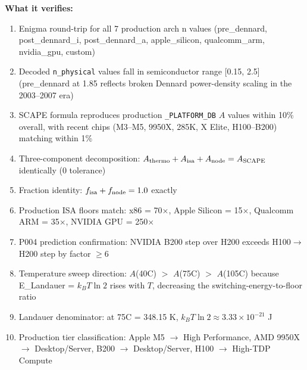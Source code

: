 \documentclass[12pt,a4paper]{article}
\begin{document}
\textbf{What it verifies:}
\begin{enumerate}
\item Enigma round-trip for all 7 production arch n values (pre\_dennard,
  post\_dennard\_i, post\_dennard\_a, apple\_silicon, qualcomm\_arm,
  nvidia\_gpu, custom)
\item Decoded \texttt{n\_physical} values fall in semiconductor range
  [0.15, 2.5] (pre\_dennard at 1.85 reflects broken Dennard power-density
  scaling in the 2003--2007 era)
\item SCAPE formula reproduces production \texttt{\_PLATFORM\_DB} $A$ values
  within 10\% overall, with recent chips (M3--M5, 9950X, 285K, X Elite,
  H100--B200) matching within 1\%
\item Three-component decomposition: $A_{\rm thermo} + A_{\rm isa} +
  A_{\rm node} = A_{\rm SCAPE}$ identically (0 tolerance)
\item Fraction identity: $f_{\rm isa} + f_{\rm node} = 1.0$ exactly
\item Production ISA floors match: x86 = 70$\times$, Apple Silicon = 15$\times$,
  Qualcomm ARM = 35$\times$, NVIDIA GPU = 250$\times$
\item P004 prediction confirmation: NVIDIA B200 step over H200 exceeds
  H100$\to$H200 step by factor $\ge 6$
\item Temperature sweep direction: $A$(40\textdegree C) $>$ $A$(75\textdegree C)
  $>$ $A$(105\textdegree C) because E\_Landauer = $k_B T \ln 2$ rises with $T$,
  decreasing the switching-energy-to-floor ratio
\item Landauer denominator: at 75\textdegree C = 348.15 K,
  $k_B T \ln 2 \approx 3.33 \times 10^{-21}$ J
\item Production tier classification: Apple M5 $\to$ High Performance,
  AMD 9950X $\to$ Desktop/Server, B200 $\to$ Desktop/Server,
  H100 $\to$ High-TDP Compute
\end{enumerate}
\end{document}
